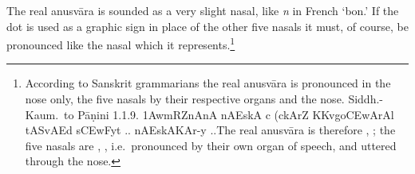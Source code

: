 The real anusvāra is sounded as a very slight nasal, like \emph{n} in
French `bon.' If the dot is used as a graphic sign in place of the other
five nasals it must, of course, be pronounced like the nasal which it
represents.\footnote{According to Sanskrit grammarians the real anusvāra
  is pronounced in the nose only, the five nasals by their respective
  organs and the nose. Siddh.-Kaum.\ to Pāṇini 1.1.9. {\dn
    \31AwmRZnAnA\2 nAEskA c {\rs (\re}ckAr\?Z
    KKvgo{\qvb}\3CEwArAl\2 tASvAEd s\3CEwFyt\?{\rs )\re} ..
    nAEskAKAr-y ..}\@ The real anusvāra is therefore
  , ; the five nasals are ,
  , i.e.\ pronounced by their own organ of speech, and
  uttered through the nose.}
